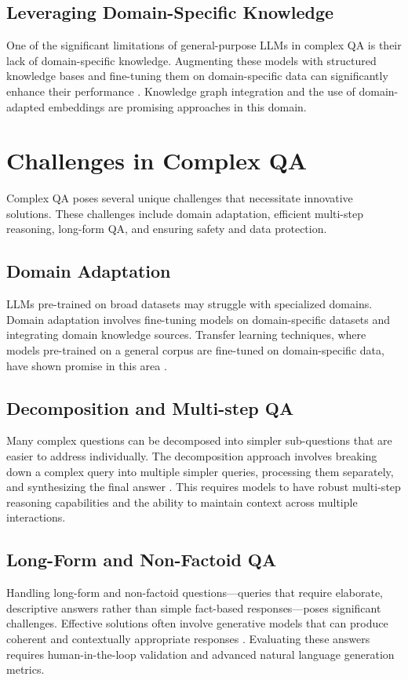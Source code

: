 \documentclass{article}
\begin{document}
\subsection{Leveraging Domain-Specific Knowledge}
One of the significant limitations of general-purpose LLMs in complex QA is their lack of domain-specific knowledge. Augmenting these models with structured knowledge bases and fine-tuning them on domain-specific data can significantly enhance their performance \cite{kassner2020bert}. Knowledge graph integration and the use of domain-adapted embeddings are promising approaches in this domain.

\section{Challenges in Complex QA}
Complex QA poses several unique challenges that necessitate innovative solutions. These challenges include domain adaptation, efficient multi-step reasoning, long-form QA, and ensuring safety and data protection.

\subsection{Domain Adaptation}
LLMs pre-trained on broad datasets may struggle with specialized domains. Domain adaptation involves fine-tuning models on domain-specific datasets and integrating domain knowledge sources. Transfer learning techniques, where models pre-trained on a general corpus are fine-tuned on domain-specific data, have shown promise in this area \cite{gururangan2020don}.

\subsection{Decomposition and Multi-step QA}
Many complex questions can be decomposed into simpler sub-questions that are easier to address individually. The decomposition approach involves breaking down a complex query into multiple simpler queries, processing them separately, and synthesizing the final answer \cite{min2019multi}. This requires models to have robust multi-step reasoning capabilities and the ability to maintain context across multiple interactions.

\subsection{Long-Form and Non-Factoid QA}
Handling long-form and non-factoid questions—queries that require elaborate, descriptive answers rather than simple fact-based responses—poses significant challenges. Effective solutions often involve generative models that can produce coherent and contextually appropriate responses \cite{krishna2021hurdles}. Evaluating these answers requires human-in-the-loop validation and advanced natural language generation metrics.
\end{document}
